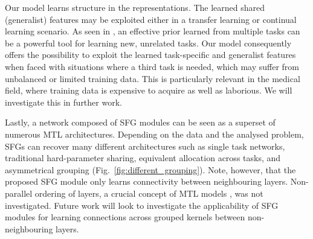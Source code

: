 Our model learns structure in the representations. The learned shared (generalist) features may be exploited either in a transfer learning or continual learning scenario. As seen in \cite{lacost2018}, an effective prior learned from multiple tasks can be a powerful tool for learning new, unrelated tasks. Our model consequently offers the possibility to exploit the learned task-specific and generalist features when faced with situations where a third task is needed, which may suffer from unbalanced or limited training data. This is particularly relevant in the medical field, where training data is expensive to acquire as well as laborious. We will investigate this in further work.

Lastly, a network composed of SFG modules can be seen as a superset of numerous MTL architectures. Depending on the data and the analysed problem, SFGs can recover many different architectures such as single task networks, traditional hard-parameter sharing, equivalent allocation across tasks, and asymmetrical grouping (Fig.~\ref{fig:different_grouping}). Note, however, that the proposed SFG module only learns connectivity between neighbouring layers. Non-parallel ordering of layers, a crucial concept of MTL models \cite{meyerson2018beyond, Ruder2019SluiceNL}, was not investigated. Future work will look to investigate the applicability of SFG modules for learning connections across grouped kernels between non-neighbouring layers.



